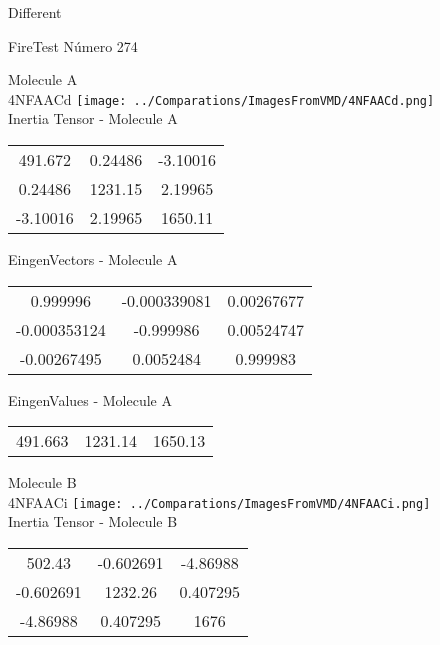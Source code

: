 \begin{center}
\vtab
\vtab
\textcolor{NavyBlue}{\Large Different}
\end{center}

 \newpage

\vtab[-2cm]
\begin{center}
{\large FireTest \tab Número 274}
\end{center}
\begin{multicols}{2}
\begin{center}

Molecule A \\ 
4NFAACd
\texttt{[image: ../Comparations/ImagesFromVMD/4NFAACd.png]}
\\
Inertia Tensor - Molecule A \\
\vtab

\begin{tabular}{|c c c|}
491.672	 & 	0.24486	 & 	-3.10016	 \\
0.24486	 & 	1231.15	 & 	2.19965	 \\
-3.10016	 & 	2.19965	 & 	1650.11
\end{tabular}

\vtab
 EingenVectors - Molecule A     \\
\vtab
\begin{tabular}{|c c c|}
0.999996	 & 	-0.000339081	 & 	0.00267677	 \\
-0.000353124	 & 	-0.999986	 & 	0.00524747	 \\
-0.00267495	 & 	0.0052484	 & 	0.999983
\end{tabular}

\vtab
 EingenValues - Molecule A     \\
\vtab
\begin{tabular}{|c c c|}
491.663	 & 	1231.14	 & 	1650.13	 \\
\end{tabular}
\columnbreak

Molecule B \\ 
4NFAACi
\texttt{[image: ../Comparations/ImagesFromVMD/4NFAACi.png]}
\\
Inertia Tensor - Molecule B \\
\vtab

\begin{tabular}{|c c c|}
502.43	 & 	-0.602691	 & 	-4.86988	 \\
-0.602691	 & 	1232.26	 & 	0.407295	 \\
-4.86988	 & 	0.407295	 & 	1676
\end{tabular}


\end{center}
\end{multicols}
